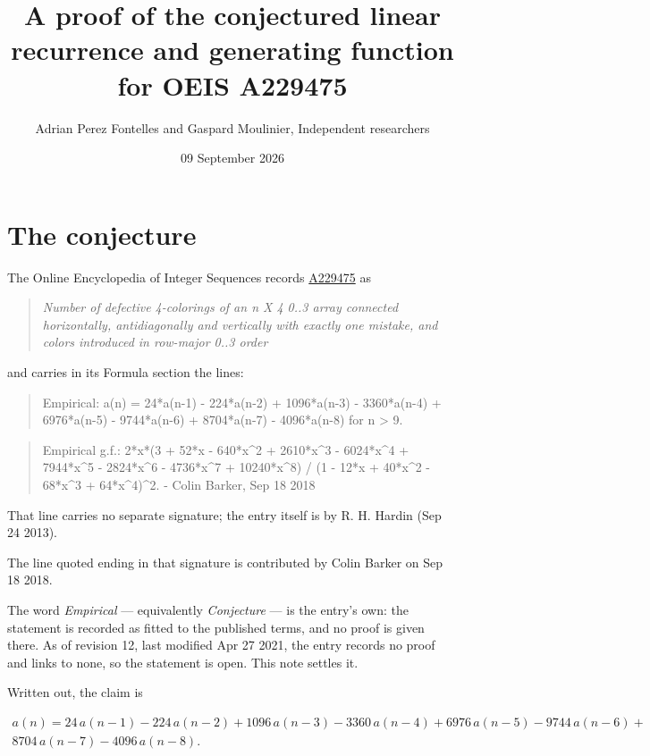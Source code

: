 \documentclass[11pt]{article}
\title{A proof of the conjectured linear recurrence and generating function for OEIS A229475}
\author{Adrian Perez Fontelles and Gaspard Moulinier, Independent researchers}
\date{09 September 2026}
\theoremstyle{definition}
\begin{document}
\maketitle
\section{The conjecture}

The Online Encyclopedia of Integer Sequences records \href{https://oeis.org/A229475}{A229475} as

\begin{quote}\itshape Number of defective 4-colorings of an n X 4 0..3 array connected horizontally, antidiagonally and vertically with exactly one mistake, and colors introduced in row-major 0..3 order\end{quote}

and carries in its Formula section the lines:

\begin{quote}\ttfamily Empirical: a(n) = 24*a(n-1) - 224*a(n-2) + 1096*a(n-3) - 3360*a(n-4) + 6976*a(n-5) - 9744*a(n-6) + 8704*a(n-7) - 4096*a(n-8) for n > 9.\end{quote}

\begin{quote}\ttfamily Empirical g.f.: 2*x*(3 + 52*x - 640*x\textasciicircum{}2 + 2610*x\textasciicircum{}3 - 6024*x\textasciicircum{}4 + 7944*x\textasciicircum{}5 - 2824*x\textasciicircum{}6 - 4736*x\textasciicircum{}7 + 10240*x\textasciicircum{}8) / (1 - 12*x + 40*x\textasciicircum{}2 - 68*x\textasciicircum{}3 + 64*x\textasciicircum{}4)\textasciicircum{}2. - Colin Barker, Sep 18 2018\end{quote}

That line carries no separate signature; the entry itself is by R. H. Hardin (Sep 24 2013).

The line quoted ending in that signature is contributed by Colin Barker on Sep 18 2018.

The word {\itshape Empirical} --- equivalently {\itshape Conjecture} --- is the entry's own: the statement is recorded as fitted to the published terms, and no proof is given there. As of revision 12, last modified Apr 27 2021, the entry records no proof and links to none, so the statement is open. This note settles it.

Written out, the claim is

\begin{multline*} a(n) = 24\,a(n-1) - 224\,a(n-2) + 1096\,a(n-3) - 3360\,a(n-4) + 6976\,a(n-5) - 9744\,a(n-6) + \\ 8704\,a(n-7) - 4096\,a(n-8). \end{multline*}
\end{document}
